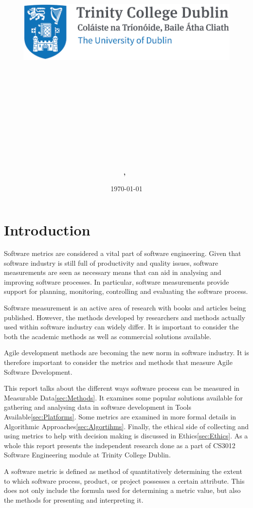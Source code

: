 \documentclass[11pt]{article}
\title{
\vspace{-1in}
\begin{figure}[!ht]
\flushleft
\includegraphics[width=0.4\linewidth]{reduced-trinity.png}
\end{figure}
\vspace{-0.5cm}
\hrulefill \\
\vspace{0.5cm}
\textmd{\textbf{\moduleCode\ \moduleName}}\\
\textmd{\textbf{\assignmentTitle}}\\
\vspace{0.5cm}
\hrulefill \\
}
\author{\textbf{\authorName,\ \authorID}}
\date{\today}
\begin{document}
\lstset{language=Java, captionpos=b, frame=single}
\captionsetup{width=.8\linewidth} 

\maketitle
\tableofcontents
\vspace{0.5in}

\section{Introduction}
\label{sec:Intro}
Software metrics are considered a vital part of software engineering.\cite{ieee-measurement-programs} Given that software industry is still full of productivity and quality issues, software measurements are seen as necessary means that can aid in analysing and improving software processes. In particular, software measurements provide support for planning, monitoring, controlling and evaluating the software process.\cite{Briand:2002:OPG:630832.631301} 

Software measurement is an active area of research with books and articles being published. However, the methods developed by researchers and methods actually used within software industry can widely differ. It is important to consider the both the academic methods as well as commercial solutions available.

Agile development methods are becoming the new norm in software industry.\cite{TARHAN2014477}\cite{hp-agile-report} It is therefore important to consider the metrics and methods that measure Agile Software Development.

This report talks about the different ways software process can be measured in Measurable Data\ref{sec:Methods}. It examines some popular solutions available for gathering and analysing data in software development in Tools Available\ref{sec:Platforms}. Some metrics are examined in more formal details in Algorithmic Approaches\ref{sec:Algortihms}. Finally, the ethical side of collecting and using metrics to help with decision making is discussed in Ethics\ref{sec:Ethics}. As a whole this report presents the independent research done as a part of CS3012 Software Engineering module at Trinity College Dublin.

A software metric is defined as method of quantitatively determining the extent to which software process, product, or project possesses a certain attribute. This does not only include the formula used for determining a metric value, but also the methods for presenting and interpreting it.\cite{Daskalantonakis:1992:PVS:141344.141353}
\end{document}
